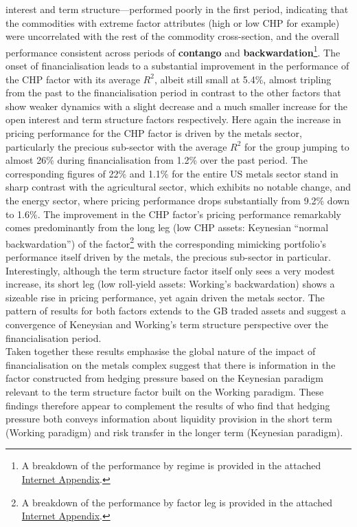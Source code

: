 \documentclass[
  authoryear,
  preprint,
  3p]{elsarticle}
\begin{document}
interest and term structure---performed poorly in the first period,
indicating that the commodities with extreme factor attributes (high or
low CHP for example) were uncorrelated with the rest of the commodity
cross-section, and the overall performance consistent across periods of
\textbf{contango} and \textbf{backwardation}\footnote{A breakdown of the
  performance by regime is provided in the attached
  \href{https://bautheac.shinyapps.io/co-movement/}{Internet Appendix}.}.
The onset of financialisation leads to a substantial improvement in the
performance of the CHP factor with its average \(R^{2}\), albeit still
small at 5.4\%, almost tripling from the past to the financialisation
period in contrast to the other factors that show weaker dynamics with a
slight decrease and a much smaller increase for the open interest and
term structure factors respectively. Here again the increase in pricing
performance for the CHP factor is driven by the metals sector,
particularly the precious sub-sector with the average \(R^{2}\) for the
group jumping to almost 26\% during financialisation from 1.2\% over the
past period. The corresponding figures of 22\% and 1.1\% for the entire
US metals sector stand in sharp contrast with the agricultural sector,
which exhibits no notable change, and the energy sector, where pricing
performance drops substantially from 9.2\% down to 1.6\%. The
improvement in the CHP factor's pricing performance remarkably comes
predominantly from the long leg (low CHP assets: Keynesian ``normal
backwardation'') of the factor\footnote{A breakdown of the performance
  by factor leg is provided in the attached
  \href{https://bautheac.shinyapps.io/co-movement/}{Internet Appendix}.}
with the corresponding mimicking portfolio's performance itself driven
by the metals, the precious sub-sector in particular. Interestingly,
although the term structure factor itself only sees a very modest
increase, its short leg (low roll-yield assets: Working's backwardation)
shows a sizeable rise in pricing performance, yet again driven the
metals sector. The pattern of results for both factors extends to the GB
traded assets and suggest a convergence of Keneysian and Working's term
structure perspective over the financialisation period.\\
Taken together these results emphasise the global nature of the impact
of financialisation on the metals complex suggest that there is
information in the factor constructed from hedging pressure based on the
Keynesian paradigm relevant to the term structure factor built on the
Working paradigm. These findings therefore appear to complement the
results of \citet{kang_tale_2020} who find that hedging pressure both
conveys information about liquidity provision in the short term (Working
paradigm) and risk transfer in the longer term (Keynesian paradigm).
\end{document}
